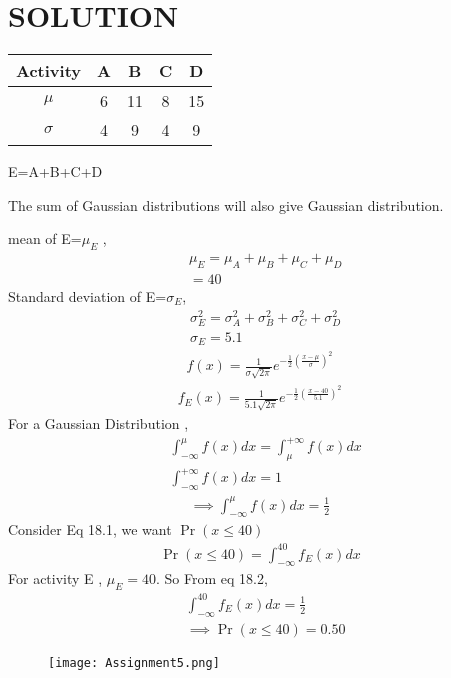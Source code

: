 \documentclass[journal,12pt,twocolumn]{IEEEtran}
\begin{document}
\section*{SOLUTION}
\begin{table}[h!]
\centering
\begin{tabular}{|c||c|c|c|c|}
    \hline
    Activity & A& B& C& D \\
    \hline
    $\mu$ & 6& 11& 8& 15\\[1ex]
    \hline
   $\sigma$ & 4& 9& 4& 9\\[1ex]
    \hline
\end{tabular}
\end{table}
E=A+B+C+D

The sum of Gaussian distributions will also give Gaussian distribution. 

mean of E=$\mu_E$ ,
\begin{align*}
&\mu_E=\mu_A+\mu_B+\mu_C+\mu_D\\
&=40
\end{align*}
Standard deviation of E=$\sigma_E$,
\begin{align*}
&\sigma_E^2=\sigma_A^2+\sigma_B^2+\sigma_C^2+\sigma_D^2\\
&\sigma_E=5.1
\end{align*}
\begin{align*}
f(x)=\frac{1}{\sigma\sqrt{2\pi}}e^{-\frac{1}{2}\left(\frac{x-\mu}{\sigma}\right)^2}
\end{align*}
\begin{align}
\tag{18.1}
f_E(x)=\frac{1}{5.1\sqrt{2\pi}}e^{-\frac{1}{2}\left(\frac{x-40}{5.1}\right)^2}
\end{align}
For a Gaussian Distribution ,
\begin{align*}
&\int_{-\infty}^{\mu}f(x)dx=\int_{\mu}^{+\infty}f(x)dx\\
&\int_{-\infty}^{+\infty}f(x)dx=1
\end{align*}
\begin{align}
\tag{18.2}
\implies\int_{-\infty}^{\mu}f(x)dx=\frac{1}{2}
\end{align}
Consider Eq 18.1, we want $\Pr(x\leq40)$
\begin{align*}
\Pr(x\leq40)=\int_{-\infty}^{40}f_E(x)dx
\end{align*}
For activity E , $\mu_E=40$. So From eq 18.2,
\begin{align*}
&\int_{-\infty}^{40}f_E(x)dx=\frac{1}{2}\\
&\implies\Pr(x\leq40)=0.50
\end{align*}
\begin{figure}[h]
    \centering
    \texttt{[image: Assignment5.png]}
    \label{fig:my_label}
\end{figure}
\end{document}
